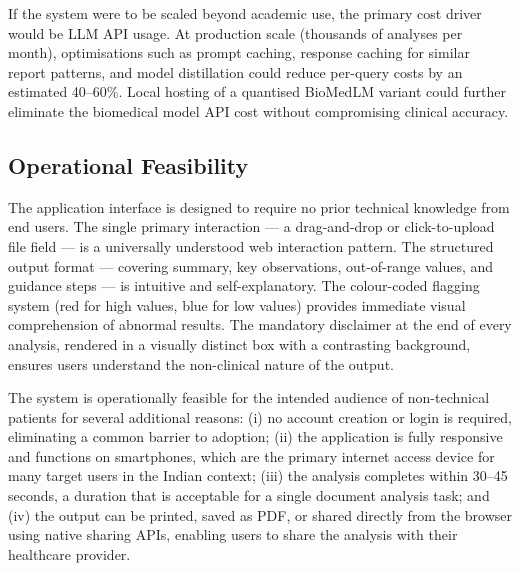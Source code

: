 If the system were to be scaled beyond academic use, the primary cost driver would be LLM API usage. At production scale (thousands of analyses per month), optimisations such as prompt caching, response caching for similar report patterns, and model distillation could reduce per-query costs by an estimated 40--60\%. Local hosting of a quantised BioMedLM variant could further eliminate the biomedical model API cost without compromising clinical accuracy.

\subsection{Operational Feasibility}
The application interface is designed to require no prior technical knowledge from end users. The single primary interaction --- a drag-and-drop or click-to-upload file field --- is a universally understood web interaction pattern. The structured output format --- covering summary, key observations, out-of-range values, and guidance steps --- is intuitive and self-explanatory. The colour-coded flagging system (red for high values, blue for low values) provides immediate visual comprehension of abnormal results. The mandatory disclaimer at the end of every analysis, rendered in a visually distinct box with a contrasting background, ensures users understand the non-clinical nature of the output.

The system is operationally feasible for the intended audience of non-technical patients for several additional reasons: (i) no account creation or login is required, eliminating a common barrier to adoption; (ii) the application is fully responsive and functions on smartphones, which are the primary internet access device for many target users in the Indian context; (iii) the analysis completes within 30--45 seconds, a duration that is acceptable for a single document analysis task; and (iv) the output can be printed, saved as PDF, or shared directly from the browser using native sharing APIs, enabling users to share the analysis with their healthcare provider.

